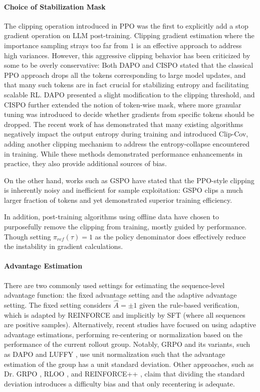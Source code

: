 \documentclass{article} %
\newcommand{\0}{\mathbb{0}}
\newcommand{\1}{\mathbb{1}}
\begin{document}
\paragraph{Choice of Stabilization Mask}
The clipping operation introduced in PPO was the first to explicitly add a stop gradient operation on LLM post-training. Clipping gradient estimation where the importance sampling strays too far from $1$ is an effective approach to address high variances. However, this aggressive clipping behavior has been criticized by some to be overly conservative: Both DAPO \citep{yu2025dapo} and CISPO \citep{chen2025minimax} stated that the classical PPO approach drops all the tokens corresponding to large model updates, and that many such tokens are in fact crucial for stabilizing entropy and facilitating scalable RL. DAPO presented a slight modification to the clipping threshold, and CISPO further extended the notion of token-wise mask, where more granular tuning was introduced to decide whether gradients from specific tokens should be dropped. The recent work of \citet{cui2025entropy} has demonstrated that many existing algorithms negatively impact the output entropy during training and introduced Clip-Cov, adding another clipping mechanism to address the entropy-collapse encountered in training. While these methods demonstrated performance enhancements in practice, they also provide additional sources of bias.

On the other hand, works such as GSPO \citep{zheng2025group} have stated that the PPO-style clipping is inherently noisy and inefficient for sample exploitation: GSPO clips a much larger fraction of tokens and yet demonstrated superior training efficiency.

In addition, post-training algorithms using offline data have chosen to purposefully remove the clipping from training, mostly guided by performance. Though setting $\pi_{ref} (\tau ) = 1$ as the policy denominator does effectively reduce the instability in gradient calculations.

\paragraph{Advantage Estimation}
There are two commonly used settings for estimating the sequence-level advantage function: the fixed advantage setting and the adaptive advantage setting. The fixed setting considers $\hat{A} = \pm 1$ given the rule-based verification, which is adapted by REINFORCE and implicitly by SFT (where all sequences are positive samples). Alternatively, recent studies have focused on using adaptive advantage estimations, performing re-centering or normalization based on the performance of the current rollout group. Notably, GRPO and its variants, such as DAPO \citep{yu2025dapo} and LUFFY \citep{yan2025learning}, use unit normalization such that the advantage estimation of the group has a unit standard deviation. Other approaches, such as Dr. GRPO \citep{liu2025understanding}, RLOO \citep{ahmadian2024back}, and REINFORCE++ \citep{hu2025reinforce++}, claim that dividing the standard deviation introduces a difficulty bias and that only recentering is adequate. 
\end{document}
